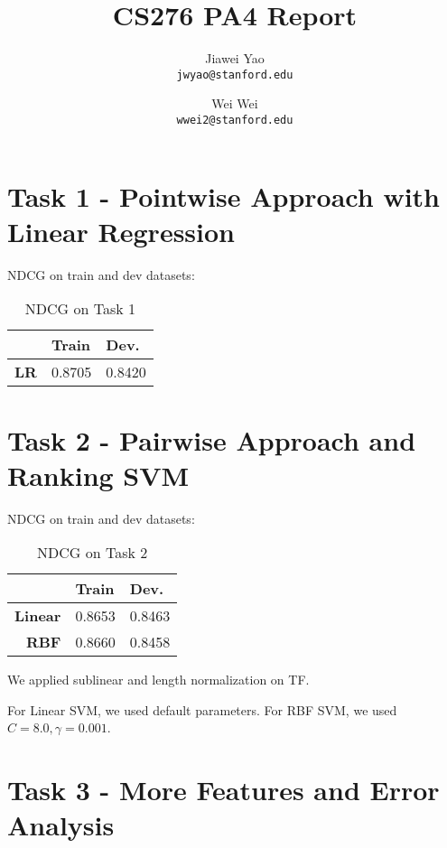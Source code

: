 \documentclass{article}
\begin{document}
\title{CS276 PA4 Report}

\author{
  Jiawei Yao\\
  \texttt{jwyao@stanford.edu}
  \and
  Wei Wei\\
  \texttt{wwei2@stanford.edu}
}

\maketitle

\section{Task 1 - Pointwise Approach with Linear Regression}

NDCG on train and dev datasets:

\begin{table}[!htb]
    \centering
    \begin{tabular}{| r | l | l |}
        \hline
        & \textbf{Train} & \textbf {Dev.} \\
        \hline
        \textbf{LR} & 0.8705 & 0.8420 \\
        \hline
    \end{tabular}
    \caption{NDCG on Task 1}
\end{table}

\section{Task 2 - Pairwise Approach and Ranking SVM}

NDCG on train and dev datasets:

\begin{table}[!htb]
    \centering
    \begin{tabular}{| r | l | l |}
        \hline
        & \textbf{Train} & \textbf {Dev.} \\
        \hline
        \textbf{Linear} & 0.8653 & 0.8463 \\
        \hline
        \textbf{RBF} & 0.8660 & 0.8458 \\
        \hline
    \end{tabular}
    \caption{NDCG on Task 2}
\end{table}

We applied sublinear and length normalization on TF.

For Linear SVM, we used default parameters. For RBF SVM, we used $C=8.0,\gamma=0.001$.

\section{Task 3 - More Features and Error Analysis}
\end{document}
